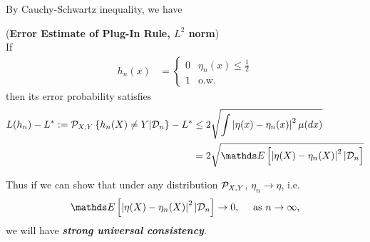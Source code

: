 \documentclass[11pt]{article}
\begin{document}
\begin{itemize}
By Cauchy-Schwartz inequality, we have
\begin{exercise}(\textbf{Error Estimate of Plug-In Rule, $L^2$ norm}) \citep{devroye2013probabilistic} \\
If \begin{align*}
h_n(x) &= \left\{ \begin{array}{cc}
0 & \eta_n(x) \le \frac{1}{2}\\
1 & \text{o.w.}
\end{array}
\right.
\end{align*} then its error probability satisfies
\begin{align}
L(h_n) - L^{*}:= \cP_{X,Y}\set{h_n(X) \neq Y | \cD_n} - L^{*} &\le 2 \sqrt{\int \abs{\eta(x) - \eta_n(x)}^2 \mu(dx)} \nonumber\\
&=2\sqrt{\E{}{\abs{\eta(X) - \eta_n(X)}^2 | \cD_n}} \label{eqn: plug_in_error_estimate_l1}
\end{align}
\end{exercise}

Thus if we can show that under any distribution ${\mathcal P}_{X,Y}$, $\eta_n \rightarrow \eta$, i.e.
\begin{align*}
\E{}{\abs{\eta(X) - \eta_n(X)}^2 | \cD_n} \rightarrow 0, \quad \text{ as }n\rightarrow \infty,
\end{align*} we will have \emph{\textbf{strong universal consistency}}.


\end{itemize}
\end{document}
